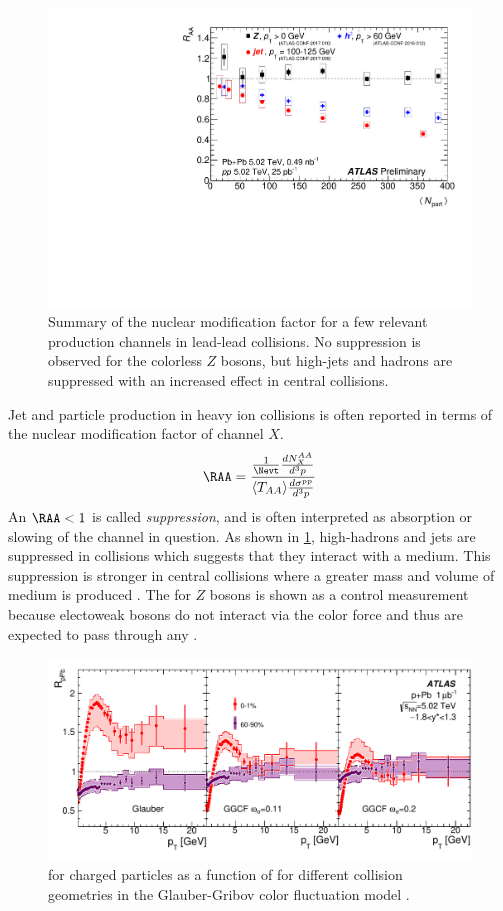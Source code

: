 \begin{figure}[t]
  \includegraphics{ATLAS_HION_Summary_Raa_02.pdf}
  \caption{Summary of the nuclear modification factor \RAA for a few relevant production channels in lead-lead collisions. No suppression is observed for the colorless $Z$ bosons, but high-\pt jets and hadrons are suppressed with an increased effect in central collisions.}
  \label{fig:pbpb_raa}
\end{figure}

Jet and particle production in heavy ion collisions is often reported in terms of the nuclear modification factor \RAA of channel $X$.
\begin{equation}
  \RAA = \frac{\frac{1}{\Nevt}\frac{d N^{AA}_{X}}{d^3 p}}{\langle T_{AA} \rangle \frac{d\sigma^{pp}}{d^3 p}}
\end{equation}
An $\RAA < 1$ is called \emph{suppression}, and is often interpreted as absorption or slowing of the channel in question.
As shown in \cref{fig:pbpb_raa}, high-\pt hadrons and jets are suppressed in \PbPb collisions which suggests that they interact with a medium.
This suppression is stronger in central collisions where a greater mass and volume of medium is produced \cite{HION-2013-06}.
The \RAA for $Z$ bosons is shown as a control measurement because electoweak bosons do not interact via the color force and thus are expected to pass through any \qgp.

\begin{figure}[t]
  \includegraphics{rppb_cp.pdf}
  \caption{\RpPb for charged particles as a function of \pt for different collision geometries in the Glauber-Gribov color fluctuation model \cite{HION-2012-14}.}
  \label{fig:rppb_cp}
\end{figure}

